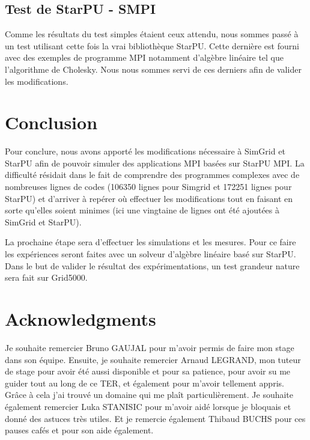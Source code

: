 \documentclass[smallextended]{svjour3}
\begin{document}
\subsection{Test de StarPU - SMPI}
\label{sec-6-2}
Comme les résultats du test simples étaient ceux attendu, nous
sommes passé à un test utilisant cette fois la vrai bibliothèque
StarPU. Cette dernière est fourni avec des exemples de programme MPI
notamment d'algèbre linéaire tel que l'algorithme de Cholesky. Nous
nous sommes servi de ces derniers afin de valider les
modifications. 
\section{Conclusion}
\label{sec-7}
Pour conclure, nous avons apporté les modifications nécessaire à 
SimGrid et StarPU afin de pouvoir simuler des applications MPI basées 
sur StarPU MPI. La difficulté résidait dans le fait de comprendre des 
programmes complexes avec de nombreuses lignes de codes (106350 lignes 
pour Simgrid et 172251 lignes pour StarPU) et d'arriver à repérer où 
effectuer les modifications tout en faisant en sorte qu'elles soient 
minimes (ici une vingtaine de lignes ont été ajoutées à SimGrid et
StarPU). 

La prochaine étape sera d'effectuer les simulations et les mesures. 
Pour ce faire les expériences seront faites avec un solveur d'algèbre 
linéaire basé sur StarPU. Dans le but de valider le résultat des 
expérimentations, un test grandeur nature sera fait sur Grid5000.  

\section*{Acknowledgments}
Je souhaite remercier Bruno GAUJAL pour m'avoir permis de faire mon
stage dans son équipe. Ensuite, je souhaite  remercier
Arnaud LEGRAND, mon tuteur de stage pour avoir été
aussi disponible et pour sa patience, pour avoir su me guider tout
au long de ce TER, et également pour m'avoir tellement appris. Grâce
à cela j'ai trouvé un domaine qui me plaît particulièrement. Je souhaite
également remercier Luka STANISIC pour m'avoir aidé lorsque je
bloquais et donné des astuces très utiles. Et je remercie également
Thibaud BUCHS pour ces pauses cafés et pour son aide également. 
\nocite{*}
\def\raggedright{}


\end{document}
